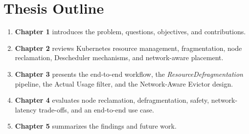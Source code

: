 \section{Thesis Outline}
\label{sec:sistematikaPenulisan}

\begin{enumerate}
    \item \textbf{Chapter 1} introduces the problem, questions, objectives, and contributions.
    \item \textbf{Chapter 2} reviews Kubernetes resource management, fragmentation, node reclamation, Descheduler mechanisms, and network-aware placement.
    \item \textbf{Chapter 3} presents the end-to-end workflow, the \textit{ResourceDefragmentation} pipeline, the Actual Usage filter, and the Network-Aware Evictor design.
    \item \textbf{Chapter 4} evaluates node reclamation, defragmentation, safety, network-latency trade-offs, and an end-to-end use case.
    \item \textbf{Chapter 5} summarizes the findings and future work.
\end{enumerate}
